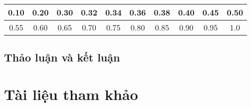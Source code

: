 \documentclass{article}
\begin{document}
\begin{center}
\begin{tabular}{|c|c|c|c|c|c|c|c|c|c|}
	\hline
	0.10 & 0.20  &0.30  &0.32  &0.34  &0.36  &0.38  &0.40  &0.45  &0.50  \\ 
	\hline
	0.55 & 0.60  &0.65  &0.70  &0.75  &0.80  &0.85  &0.90  &0.95  &1.0 \\
	\hline
\end{tabular} 
\end{center}

\subsection{Thảo luận và kết luận}

\section{Tài liệu tham khảo}


	\newpage
	
	
	
\end{document}
